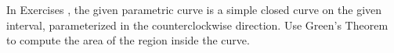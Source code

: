 {\noindent In Exercises} 
{, the given parametric curve is a simple closed curve on the given interval, parameterized in the counterclockwise direction.  Use Green's Theorem to compute the area of the region inside the curve.
}
